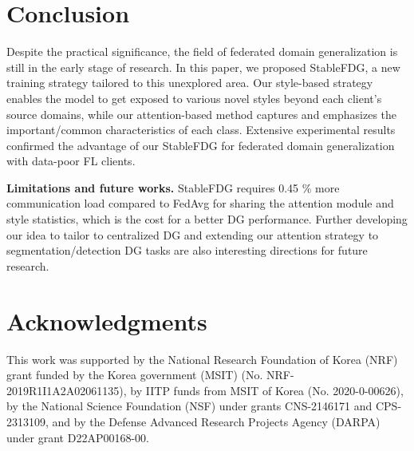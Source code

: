 \documentclass{article}
\theoremstyle{plain}
\theoremstyle{definition}
\theoremstyle{remark}
\begin{document}
\section{Conclusion}
 \vspace{-1mm}
 
 
Despite the practical significance, the field of federated domain generalization is still in the early stage of research. In this paper, we proposed StableFDG, a new training strategy tailored to this unexplored area. Our style-based strategy enables the model to get exposed to various novel styles beyond each client's source domains, while our attention-based method captures and emphasizes the important/common characteristics of each class. Extensive experimental results confirmed the advantage of our StableFDG for federated domain generalization with data-poor FL clients.

  \vspace{-0.5mm}

 
 \textbf{Limitations and future works.}  StableFDG requires 0.45 \% more communication load compared to FedAvg for sharing the attention module and style statistics, which is the cost for  a better DG   performance. 
 Further developing our idea to tailor to centralized DG and extending our attention
strategy  to segmentation/detection DG tasks are also interesting directions for future research.%
 
\section*{Acknowledgments}
This work was supported by the National Research Foundation of Korea (NRF) grant funded by the Korea government (MSIT) (No. NRF-2019R1I1A2A02061135), by IITP funds from MSIT of Korea (No. 2020-0-00626),  by the National Science Foundation (NSF) under grants CNS-2146171 and CPS-2313109, and by the Defense Advanced Research Projects Agency (DARPA) under grant D22AP00168-00.
\end{document}
